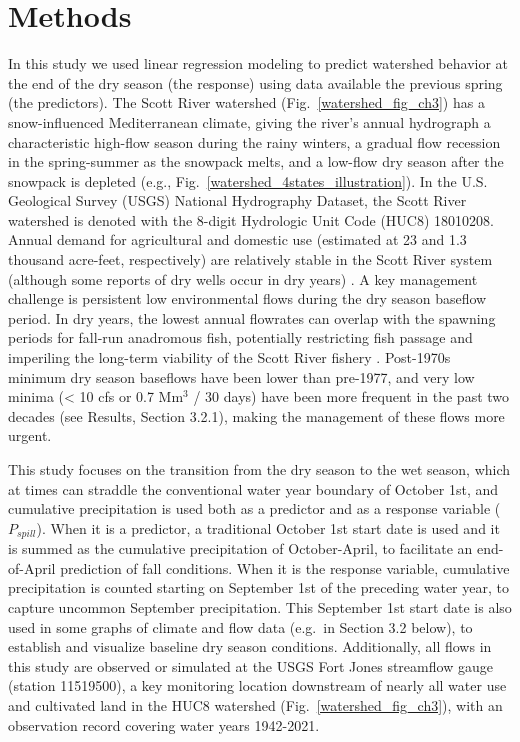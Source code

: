 \documentclass[hess, manuscript]{copernicus}
\begin{document}
\section{Methods}

In this study we used linear regression modeling to predict watershed
behavior at the end of the dry season (the response) using data
available the previous spring (the predictors). The Scott River
watershed (Fig.~\ref{watershed_fig_ch3}) has a snow-influenced
Mediterranean climate, giving the river's annual hydrograph a
characteristic high-flow season during the rainy winters, a gradual flow
recession in the spring-summer as the snowpack melts, and a low-flow dry
season after the snowpack is depleted (e.g.,
Fig.~\ref{watershed_4states_illustration}). In the U.S. Geological
Survey (USGS) National Hydrography Dataset, the Scott River watershed is
denoted with the 8-digit Hydrologic Unit Code (HUC8) 18010208. Annual
demand for agricultural and domestic use (estimated at 23 and 1.3
thousand acre-feet, respectively) \citep{DWR2004} are
relatively stable in the Scott River system (although some reports of
dry wells occur in dry years) \citep{SiskiyouCounty2021}. A key management challenge is persistent
low environmental flows during the dry season baseflow period. In dry
years, the lowest annual flowrates can overlap with the spawning periods
for fall-run anadromous fish, potentially restricting fish passage and
imperiling the long-term viability of the Scott River fishery
\citep{SiskiyouCounty2021}. Post-1970s minimum
dry season baseflows have been lower than pre-1977, and very low minima
(\textless{} 10 cfs or 0.7 Mm$^\mathrm{3}$ / 30 days) have been
more frequent in the past two decades (see Results, Section 3.2.1),
making the management of these flows more urgent.

This study focuses on the transition from the dry season to the wet
season, which at times can straddle the conventional water year boundary
of October 1st, and cumulative precipitation is used both as a predictor
and as a response variable ($P_{spill}$). When it is a predictor, a
traditional October 1st start date is used and it is summed as the
cumulative precipitation of October-April, to facilitate an end-of-April
prediction of fall conditions. When it is the response variable,
cumulative precipitation is counted starting on September 1st of the
preceding water year, to capture uncommon September precipitation. This
September 1st start date is also used in some graphs of climate and flow
data (e.g.~in Section 3.2 below), to establish and visualize baseline
dry season conditions. Additionally, all flows in this study are
observed or simulated at the USGS Fort Jones streamflow gauge (station
11519500), a key monitoring location downstream of nearly all water use
and cultivated land in the HUC8 watershed
(Fig.~\ref{watershed_fig_ch3}), with an observation record covering
water years 1942-2021.
\end{document}
